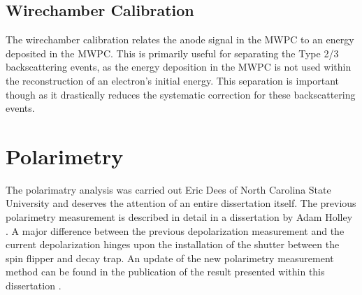 \subsection{Wirechamber Calibration}

The wirechamber calibration relates the anode signal in the MWPC to an energy deposited in the MWPC. This is
primarily useful for separating the Type 2/3 backscattering events, as the
energy deposition in the MWPC is not used within the reconstruction of an electron's initial
energy. This separation is important though as it drastically reduces the systematic
correction for these backscattering events.
 

\section{Polarimetry} \label{sec:polarimetry}

The polarimatry analysis was carried out Eric Dees of North Carolina State University and
deserves the attention of an entire dissertation itself. The previous polarimetry measurement
is described in detail in a dissertation by Adam Holley \cite{holley2012ultracold}. A major
difference between the previous depolarization measurement and the current depolarization
hinges upon the installation of the shutter between the spin flipper and decay trap. An
update of the new polarimetry measurement method can be found in the publication of the result
presented within this dissertation \cite{brown2017}.

